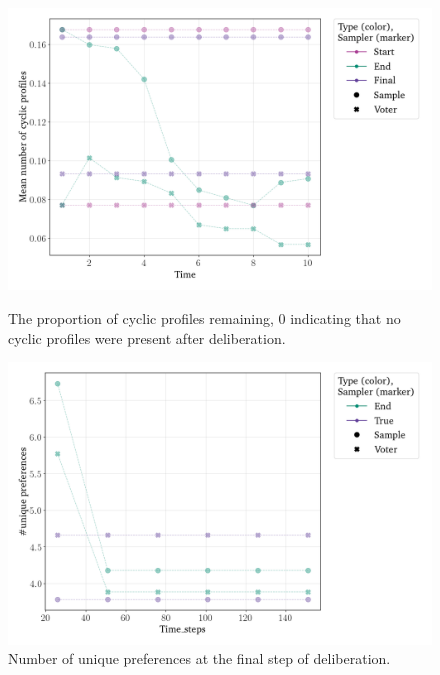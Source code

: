 \begin{figure}[htbp]
	\centering
	\begin{minipage}{0.45\textwidth}
		\centering
		\includegraphics[width=\textwidth]{Figures/delib_Mean Number of Cyclic Profiles.png}
		\caption{The proportion of cyclic profiles remaining, 0 indicating that no cyclic profiles were present after deliberation.}
		\label{fig:degroot_cyclic}
	\end{minipage}\hfill
	\begin{minipage}{0.45\textwidth}
		\centering
		\vspace{-9pt}
		\includegraphics[width=\textwidth]{Figures/delib_number_Unique Preferences.png}
		\caption{Number of unique preferences at the final step of deliberation.}
		\label{fig:degroot_count}
	\end{minipage}

	\vspace{1em}


\end{figure}
